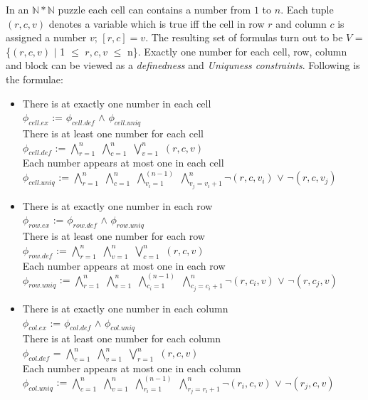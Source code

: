 \documentclass[letterpaper]{article}
\begin{document}
	In an $\mathbb{N}\ast\mathbb{N}$ puzzle each cell can contains a number from $1$ to $n$. Each tuple $(r,c,v)$ denotes a variable which is true iff the cell in row $r$ and column $c$ is assigned a number $v$; $[r, c] = v$. The resulting set of formulas turn out to be $V$ = \{$(r,c,v)$ $|$ 1 $\leq$ $r,c,v$ $\leq$ n\}. Exactly one number for each cell, row, column and block can be viewed as a \textit{definedness} and \textit{Uniquness constraints}. Following is the formulae:
\begin{itemize}
\item There is at exactly one number in each cell\\
$\phi_{cell.ex}$ := $\phi_{cell.def}$ $\wedge$ $\phi_{cell.uniq}$\\
There is at least one number for each cell \\
 $\phi_{cell.def}$ := $\bigwedge_{r=1}^n$ $\bigwedge_{c=1}^n$ $\bigvee_{v=1}^n$ $(r,c,v)$\\
Each number appears at most one in each cell\\
$\phi_{cell.uniq}$ := $\bigwedge_{r=1}^n$ $\bigwedge_{c=1}^n$ $\bigwedge_{v_{i}=1}^{(n-1)}$ $\bigwedge_{v_{j}=v_{i} + 1}^n$$\neg(r,c,v_i)$ $\vee$ $\neg(r,c,v_j)$

\item There is at exactly one number in each row\\
$\phi_{row.ex}$ := $\phi_{row.def}$ $\wedge$ $\phi_{row.uniq}$\\
There is at least one number for each row \\
 $\phi_{row.def}$ := $\bigwedge_{r=1}^n$ $\bigwedge_{v=1}^n$ $\bigvee_{c=1}^n$ $(r,c,v)$\\
Each number appears at most one in each row\\
$\phi_{row.uniq}$ := $\bigwedge_{r=1}^n$ $\bigwedge_{v=1}^n$ $\bigwedge_{c_{i}=1}^{(n-1)}$ $\bigwedge_{c_{j}=c_{i} + 1}^n$$\neg(r,c_i,v)$ $\vee$ $\neg(r,c_j,v)$


\item There is at exactly one number in each column\\
$\phi_{col.ex}$ := $\phi_{col.def}$ $\wedge$ $\phi_{col.uniq}$\\
There is at least one number for each column \\
 $\phi_{col.def}$ = $\bigwedge_{c=1}^n$ $\bigwedge_{v=1}^n$ $\bigvee_{r=1}^n$ $(r,c,v)$\\
Each number appears at most one in each column\\
$\phi_{col.uniq}$ := $\bigwedge_{c=1}^n$ $\bigwedge_{v=1}^n$ $\bigwedge_{r_{i}=1}^{(n-1)}$ $\bigwedge_{r_{j}=r_{i} + 1}^n$$\neg(r_i,c,v)$ $\vee$ $\neg(r_j,c,v)$



\end{itemize}
\end{document}
